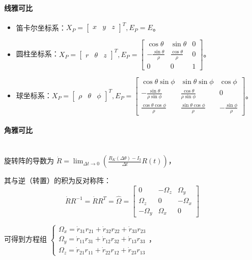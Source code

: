 \documentclass[
12pt, %
a4paper, 
oneside, %
headinclude,footinclude, %
]{scrartcl}
\begin{document}
\paragraph{线雅可比}
\begin{itemize}
\item 笛卡尔坐标系：$ X_P = \begin{bmatrix} x & y & z \end{bmatrix}^T, E_P = E $。
\item 圆柱坐标系：$ X_P = \begin{bmatrix} r & \theta & z \end{bmatrix}^T, E_P = \begin{bmatrix} \cos\theta & \sin\theta & 0 \\ -\frac{\sin\theta}{\rho} & \frac{\cos\theta}{\rho} & 0 \\ 0 & 0 & 1 \end{bmatrix} $。
\item 球坐标系：$ X_P = \begin{bmatrix} \rho & \theta & \phi \end{bmatrix}^T, E_P = \begin{bmatrix} \cos\theta \sin\phi & \sin\theta \sin\phi & \cos\phi \\ -\frac{\sin\theta}{\rho \sin\phi} & \frac{\cos\theta}{\rho \sin\phi} & 0 \\ \frac{\cos\theta \cos\phi}{\rho} & \frac{\sin\theta \cos\phi}{\rho} & -\frac{\sin\phi}{\rho} \end{bmatrix} $。
\end{itemize} 
\paragraph{角雅可比}~\\

旋转阵的导数为
$ \dot{R} = \lim_{\Delta t \to 0} (\frac{R_K(\Delta\theta) - I_3}{\Delta t} R(t)) $，

其与逆（转置）的积为反对称阵：
$$ \dot{R} R^{-1} = \dot{R} R^T = \hat{\Omega} = \begin{bmatrix} 0 & -\Omega_z & \Omega_y \\ \Omega_z & 0 & -\Omega_x \\ -\Omega_y & \Omega_x & 0 \end{bmatrix} $$

可得到方程组
$
\begin{cases}
\Omega_x = \dot{r}_{31} r_{21} + \dot{r}_{32} r_{22} + \dot{r}_{33} r_{23} \\
\Omega_y = \dot{r}_{11} r_{31} + \dot{r}_{12} r_{32} + \dot{r}_{13} r_{33} \\
\Omega_z = \dot{r}_{21} r_{11} + \dot{r}_{22} r_{12} + \dot{r}_{23} r_{13}
\end{cases}
$，
\end{document}
